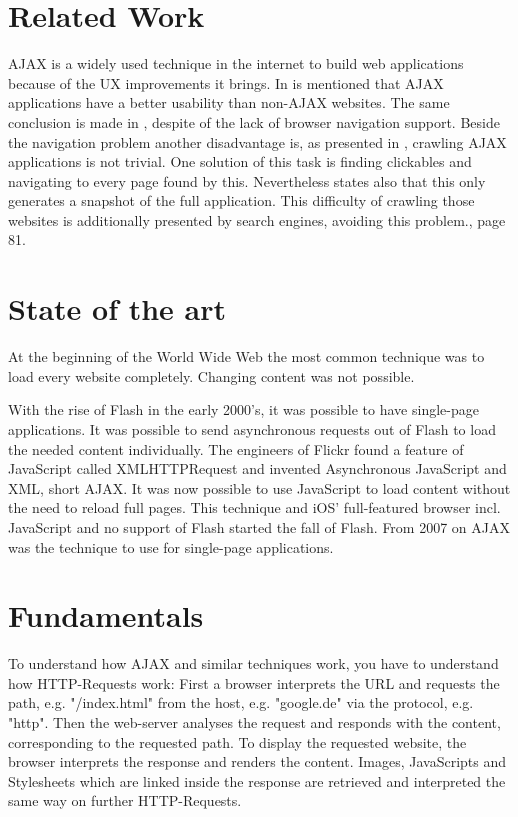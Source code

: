 \documentclass[f,bachelor,binding,twoside,palatino]{WeSTthesis}
\def \ajax {AJAX}
\def \singlePageApplication {single-page application}
\begin{document}
\section{Related Work}
  \ajax{} is a widely used technique in the internet to build web applications because of the UX improvements it brings.
  In \cite{roodt06} is mentioned that \ajax{} applications have a better usability than non-\ajax{} websites.
  The same conclusion is made in \cite{klugeKarglWeber07}, despite of the lack of browser navigation support.
  Beside the navigation problem another disadvantage is, as presented in \cite{mesbah09}, crawling \ajax{} applications is not trivial.
  One solution of this task is finding clickables and navigating to every page found by this.
  Nevertheless \cite{mesbah09} states also that this only generates a snapshot of the full application.
  This difficulty of crawling those websites is additionally presented by search engines, avoiding this problem.\cite{matter08}, page 81.


\section{State of the art}
  At the beginning of the World Wide Web the most common technique was to load every website completely. Changing content was not possible.
    
  With the rise of Flash in the early 2000's, it was possible to have \singlePageApplication{}s. It was possible to send asynchronous requests out of Flash to load the needed content individually.
  The engineers of Flickr found a feature of JavaScript called XMLHTTPRequest and invented Asynchronous JavaScript and XML, short \ajax{}. It was now possible to use JavaScript to load content without the need to reload full pages.
  This technique and iOS' full-featured browser incl. JavaScript and no support of Flash started the fall of Flash. From 2007 on \ajax{} was the technique to use for \singlePageApplication{}s.
  
\section{Fundamentals}
  To understand how \ajax{} and similar techniques work, you have to understand how HTTP-Requests work:
  First a browser interprets the URL and requests the path, e.g. "/index.html" from the host, e.g. "google.de" via the protocol, e.g. "http".
  Then the web-server analyses the request and responds with the content, corresponding to the requested path.
  To display the requested website, the browser interprets the response and renders the content. 
  Images, JavaScripts and Stylesheets which are linked inside the response are retrieved and interpreted the same way on further HTTP-Requests.
\end{document}
